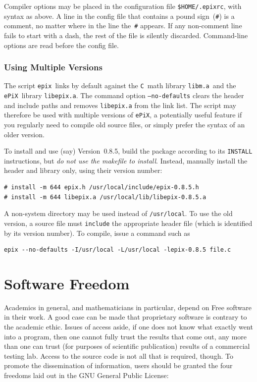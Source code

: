 \documentclass[12pt]{report}
\newcommand{\code}[1]{\texttt{#1}}
\newcommand{\filename}[1]{\texttt{#1}}
\newcommand{\ePiX}{\code{ePiX}}
\begin{document}
Compiler options may be placed in the configuration file
\filename{\$HOME/.epixrc}, with syntax as above. A line in the config
file that contains a pound sign~(\code{\#}) is a comment, no matter
where in the line the~\code{\#} appears. If any non-comment line
fails to start with a dash, the rest of the file is silently
discarded.  Command-line options are read before the config file.


\subsection*{Using Multiple Versions}

The script \filename{epix}~links by default against the \code{C}~math
library \code{libm.a}~and the \ePiX\ library \code{libepix.a}.  The
command option \code{--no-defaults} clears the header and include
paths and removes \code{libepix.a} from the link list. The script may
therefore be used with multiple versions of \ePiX, a potentially
useful feature if you regularly need to compile old source files, or
simply prefer the syntax of an older version.

To install and use (say) Version~0.8.5, build the package according to
its \filename{INSTALL} instructions, but \emph{do not use the makefile
  to install}. Instead, manually install the header and library only,
using their version number:
\begin{verbatim}
# install -m 644 epix.h /usr/local/include/epix-0.8.5.h
# install -m 644 libepix.a /usr/local/lib/libepix-0.8.5.a
\end{verbatim}
A non-system directory may be used instead of \filename{/usr/local}.
To use the old version, a source file must \code{include} the
appropriate header file (which is identified by its version number).
To compile, issue a command such as
\begin{verbatim}
epix --no-defaults -I/usr/local -L/usr/local -lepix-0.8.5 file.c
\end{verbatim}



\appendix
\chapter{Software Freedom}

Academics in general, and mathematicians in particular, depend on Free
software in their work. A good case can be made that proprietary
software is contrary to the academic ethic. Issues of access aside, if
one does not know what exactly went into a program, then one cannot
fully trust the results that come out, any more than one can trust
(for purposes of scientific publication) results of a commercial
testing lab.  Access to the source code is not all that is required,
though. To promote the dissemination of information, users should be
granted the four freedoms laid out in the GNU General Public License:
\smallskip
\end{document}
